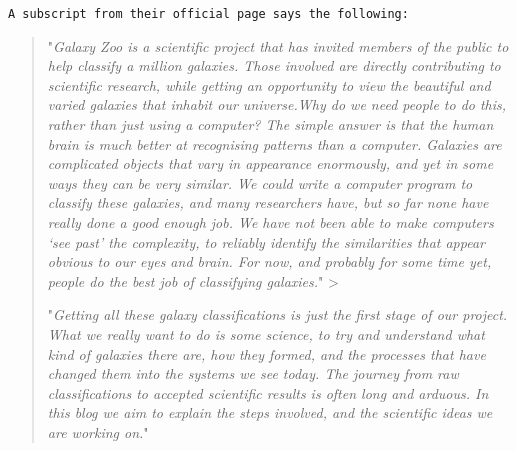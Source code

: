 \documentclass[11pt]{article}
\begin{document}
\begin{verbatim}
A subscript from their official page says the following:
\end{verbatim}

\begin{quote}
"\emph{Galaxy Zoo is a scientific project that has invited members of
the public to help classify a million galaxies. Those involved are
directly contributing to scientific research, while getting an
opportunity to view the beautiful and varied galaxies that inhabit our
universe.Why do we need people to do this, rather than just using a
computer? The simple answer is that the human brain is much better at
recognising patterns than a computer. Galaxies are complicated objects
that vary in appearance enormously, and yet in some ways they can be
very similar. We could write a computer program to classify these
galaxies, and many researchers have, but so far none have really done a
good enough job. We have not been able to make computers `see past' the
complexity, to reliably identify the similarities that appear obvious to
our eyes and brain. For now, and probably for some time yet, people do
the best job of classifying galaxies.}" \textgreater{}

"\emph{Getting all these galaxy classifications is just the first stage
of our project. What we really want to do is some science, to try and
understand what kind of galaxies there are, how they formed, and the
processes that have changed them into the systems we see today. The
journey from raw classifications to accepted scientific results is often
long and arduous. In this blog we aim to explain the steps involved, and
the scientific ideas we are working on.}"
\end{quote}
\end{document}
